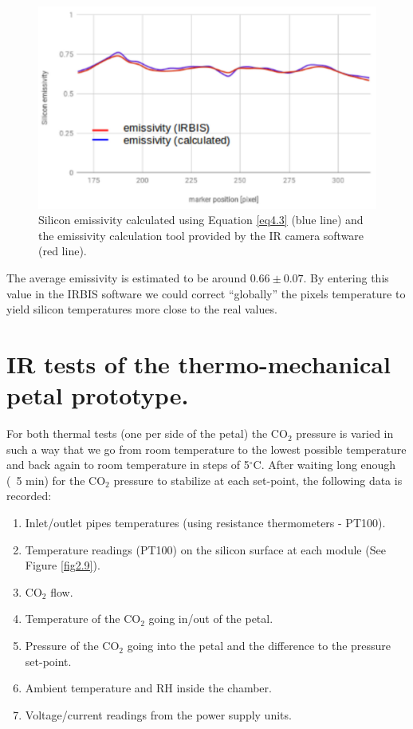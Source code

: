 		\begin{figure}[ht!]
			\centering
			\captionsetup{justification=centering,margin=2cm}
			\includegraphics[scale=0.35]{Figures/Chapter04/SiliconEmissivityCalculatedVSIRBIS.jpg}
			\caption{Silicon emissivity calculated using Equation \ref{eq4.3} (blue line) and the emissivity calculation tool provided by the IR camera software (red line).}\label{fig4.4}
		\end{figure}
		
		The average emissivity is estimated to be around $0.66 \pm 0.07$. By entering this value in the IRBIS software we could correct “globally” the pixels temperature to yield silicon temperatures more close to the real values.\bigskip
		
	\section{IR tests of the thermo-mechanical petal prototype.}\label{section4.3}
		
		For both thermal tests (one per side of the petal) the CO$_{2}$ pressure is varied in such a way that we go from room temperature to the lowest possible temperature and back again to room temperature in steps of 5$^{\circ}$C. After waiting long enough (~5 min) for the CO$_{2}$ pressure to stabilize at each set-point, the following data is recorded:
		
		\begin{enumerate}[label={\arabic*)}]
			\item Inlet/outlet pipes temperatures (using resistance thermometers - PT100).
			\item Temperature readings (PT100) on the silicon surface at each module (See Figure \ref{fig2.9}).
			\item CO$_{2}$ flow.
			\item Temperature of the CO$_{2}$ going in/out of the petal.
			\item Pressure of the CO$_{2}$ going into the petal and the difference to the pressure set-point.
			\item Ambient temperature and RH inside the chamber.
			\item Voltage/current readings from the power supply units.
		\end{enumerate}
		
